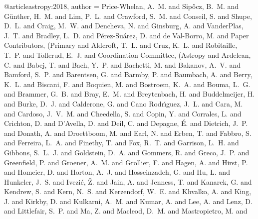 @article{astropy:2018,
  author =        {{Price-Whelan}, A.~M. and {Sip{\H{o}}cz}, B.~M. and
                   {G{\"u}nther}, H.~M. and {Lim}, P.~L. and
                   {Crawford}, S.~M. and {Conseil}, S. and
                   {Shupe}, D.~L. and {Craig}, M.~W. and {Dencheva}, N. and
                   {Ginsburg}, A. and {VanderPlas}, J.~T. and
                   {Bradley}, L.~D. and {P{\'e}rez-Su{\'a}rez}, D. and
                   {de Val-Borro}, M. and {Paper Contributors}, (Primary and
                   {Aldcroft}, T.~L. and {Cruz}, K.~L. and
                   {Robitaille}, T.~P. and {Tollerud}, E.~J. and
                   {Coordination Committee}, (Astropy and {Ardelean}, C. and
                   {Babej}, T. and {Bach}, Y.~P. and {Bachetti}, M. and
                   {Bakanov}, A.~V. and {Bamford}, S.~P. and
                   {Barentsen}, G. and {Barmby}, P. and {Baumbach}, A. and
                   {Berry}, K.~L. and {Biscani}, F. and {Boquien}, M. and
                   {Bostroem}, K.~A. and {Bouma}, L.~G. and
                   {Brammer}, G.~B. and {Bray}, E.~M. and
                   {Breytenbach}, H. and {Buddelmeijer}, H. and
                   {Burke}, D.~J. and {Calderone}, G. and
                   {Cano Rodr{\'\i}guez}, J.~L. and {Cara}, M. and
                   {Cardoso}, J.~V.~M. and {Cheedella}, S. and
                   {Copin}, Y. and {Corrales}, L. and {Crichton}, D. and
                   {D{\textquoteright}Avella}, D. and {Deil}, C. and
                   {Depagne}, {\'E}. and {Dietrich}, J.~P. and
                   {Donath}, A. and {Droettboom}, M. and {Earl}, N. and
                   {Erben}, T. and {Fabbro}, S. and {Ferreira}, L.~A. and
                   {Finethy}, T. and {Fox}, R.~T. and {Garrison}, L.~H. and
                   {Gibbons}, S.~L.~J. and {Goldstein}, D.~A. and
                   {Gommers}, R. and {Greco}, J.~P. and {Greenfield}, P. and
                   {Groener}, A.~M. and {Grollier}, F. and {Hagen}, A. and
                   {Hirst}, P. and {Homeier}, D. and {Horton}, A.~J. and
                   {Hosseinzadeh}, G. and {Hu}, L. and {Hunkeler}, J.~S. and
                   {Ivezi{\'c}}, {\v{Z}}. and {Jain}, A. and
                   {Jenness}, T. and {Kanarek}, G. and {Kendrew}, S. and
                   {Kern}, N.~S. and {Kerzendorf}, W.~E. and
                   {Khvalko}, A. and {King}, J. and {Kirkby}, D. and
                   {Kulkarni}, A.~M. and {Kumar}, A. and {Lee}, A. and
                   {Lenz}, D. and {Littlefair}, S.~P. and {Ma}, Z. and
                   {Macleod}, D.~M. and {Mastropietro}, M. and
}}
